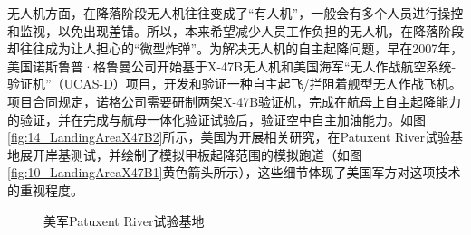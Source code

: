 无人机方面，在降落阶段无人机往往变成了“有人机”，一般会有多个人员进行操控和监视，以免出现差错。所以，本来希望减少人员工作负担的无人机，在降落阶段却往往成为让人担心的“微型炸弹”。为解决无人机的自主起降问题，早在2007年，美国诺斯鲁普·格鲁曼公司开始基于X-47B无人机和美国海军“无人作战航空系统-验证机”（UCAS-D）项目，开发和验证一种自主起飞/拦阻着舰型无人作战飞机。项目合同规定，诺格公司需要研制两架X-47B验证机，完成在航母上自主起降能力的验证，并在完成与航母一体化验证试验后，验证空中自主加油能力。如图\ref{fig:14_LandingAreaX47B2}所示，美国为开展相关研究，在Patuxent River试验基地展开岸基测试，并绘制了模拟甲板起降范围的模拟跑道（如图\ref{fig:10_LandingAreaX47B1}黄色箭头所示），这些细节体现了美国军方对这项技术的重视程度。
\begin{figure}[htb]
	\centering%
	\hspace{0.7em}%
	\caption{美军Patuxent River试验基地}
	\label{fig:14_LandingAreaX47B}
\end{figure}

